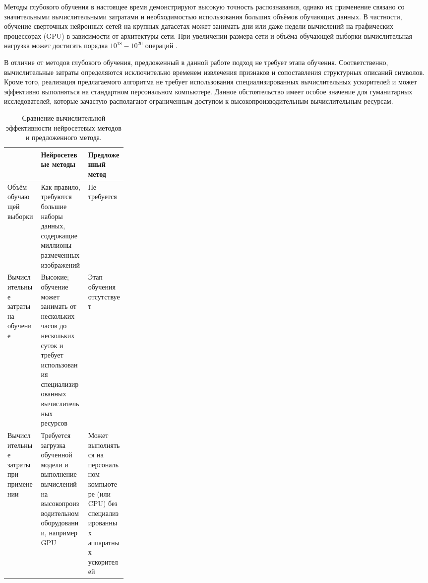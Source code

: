 Методы глубокого обучения в настоящее время демонстрируют высокую точность распознавания, однако их применение связано со значительными вычислительными затратами и необходимостью использования больших объёмов обучающих данных. В частности, обучение сверточных нейронных сетей на крупных датасетах может занимать дни или даже недели вычислений на графических процессорах (GPU) в зависимости от архитектуры сети. При увеличении размера сети и объёма обучающей выборки вычислительная нагрузка может достигать порядка $10^{18} - 10^{20}$ операций \cite{10.1145/3225058.3225069}.

В отличие от методов глубокого обучения, предложенный в данной работе подход не требует этапа обучения. Соответственно, вычислительные затраты определяются исключительно временем извлечения признаков и сопоставления структурных описаний символов. Кроме того, реализация предлагаемого алгоритма не требует использования специализированных вычислительных ускорителей и может эффективно выполняться на стандартном персональном компьютере. Данное обстоятельство имеет особое значение для гуманитарных исследователей, которые зачастую располагают ограниченным доступом к высокопроизводительным вычислительным ресурсам.

\begin{table}[!htbp]
    \centering
    \captionsetup{justification=centering}
    \caption{Сравнение вычислительной эффективности нейросетевых методов и предложенного метода.}
    \label{tab:src_compare}

    \begin{tabularx}{\linewidth}{>{\raggedright\arraybackslash}p{0.28\linewidth} X X}
        \toprule
         & \textbf{Нейросетевые методы} & \textbf{Предложенный метод} \\
        \midrule

        Объём обучающей выборки
         &
        Как правило, требуются большие наборы данных, содержащие миллионы размеченных изображений
         &
        Не требуется
        \\
        \midrule
        Вычислительные затраты на обучение
         &
        Высокие; обучение может занимать от нескольких часов до нескольких суток и требует использования специализированных вычислительных ресурсов
         &
        Этап обучения отсутствует
        \\
        \midrule
        Вычислительные затраты при применении
         &
        Требуется загрузка обученной модели и выполнение вычислений на высокопроизводительном оборудовании, например GPU
         &
        Может выполняться на персональном компьютере (или CPU) без специализированных аппаратных ускорителей
        \\

        \bottomrule
    \end{tabularx}
\end{table}

